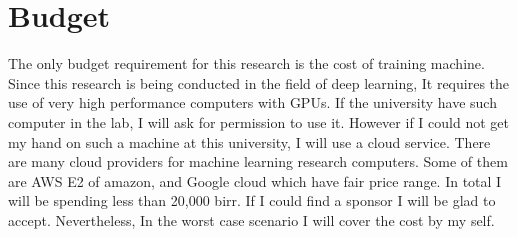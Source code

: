 \documentclass[../main/main.tex]{subfiles}
\begin{document}
	\section{Budget}
	The only budget requirement for this research is the cost of training machine. Since this research is being conducted in the field of deep learning, It requires the use of very high performance computers with \gls{GPU}s. If the university have such computer in the lab, I will ask for permission to use it. However if I could not get my hand on such a machine at this university, I will use a cloud service. There are many cloud providers for machine learning research computers. Some of them are AWS E2 of amazon, and Google cloud which have fair price range. In total I will be spending less than 20,000 birr. If I could find a sponsor I will be glad to accept. Nevertheless, In the worst case scenario I will cover the cost by my self.   	
\end{document}
